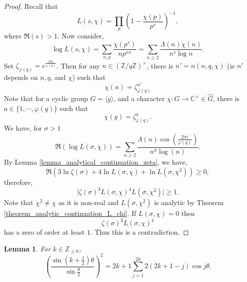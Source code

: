 \documentclass{article}
\newtheorem{lemma}{Lemma}[section]
\newcommand{\Z}[0]{\mathbb{Z}}
\newcommand{\C}[0]{\mathbb{C}}
\begin{document}
\begin{proof}
Recall that 
\begin{equation*}
  L(s,\chi) = \prod_{p}\left(1-{\frac {\chi(p)}{p^s}}\right)^{-1},
\end{equation*}
where $\Re(s)>1$. Now consider,
\begin{equation*}
  \log L(s,\chi) = \sum_{n,p}{\frac {\chi(p^s)} {np^{ns}}} = \sum_{n\geq 2}{\frac {\Lambda(n)\chi(n)} {n^s\log n}}.
\end{equation*}
Set $\zeta_{\varphi(q)} = e^{{\frac {2\pi i} {\varphi(q)}}}$. Then for any $n\in(\Z/q\Z)^\times$, there is $n'=n(n,q,\chi)$ (ie $n'$ depends on $n,q$, and $\chi$) such that 
\begin{equation*}
  \chi(n) = \zeta_{\varphi(q)}^{n'}
\end{equation*}
Note that for a cyclic group $G = \langle g\rangle$, and a character $\chi:G\to\C^\times\in\hat{G}$, there is $a\in\{1,\cdots,\varphi(q)\}$ such that 
\begin{equation*}
  \chi(g) = \zeta_{\varphi(q)}^a.
\end{equation*}
We have, for $\sigma>1$
\begin{equation*}
  \Re(\log L(\sigma,\chi)) = \sum_{n\geq2}{\frac {\Lambda(n)\cos\left({\frac {2\pi i} {\varphi(q)}}\right)} {n^\sigma\log(n)}}.
\end{equation*}
By Lemma \ref{lemma_analytical_continuation_zeta}, we have,
\begin{equation*}
  \Re(3\ln\zeta(\sigma)+4\ln L(\sigma,\chi)+\ln L(\sigma,\chi^2))\geq 0,
\end{equation*}
therefore,
\begin{equation*}
  \vert \zeta(\sigma)^3L(\sigma,\chi)^4L(\sigma,\chi^2)\vert\geq1.
\end{equation*}
Note that $\chi^2\not=\chi$ as it is non-real and $L(\sigma,\chi^2)$ is analytic by Theorem \ref{theorem_analytic_continuation_L_chi}. If $L(\sigma,\chi)=0$ then 
\begin{equation*}
  \zeta(\sigma)^3L(\sigma,\chi)^4
\end{equation*}
has a zero of order at least $1$. Thus this is a contradiction.
\end{proof}

\begin{lemma}For $k\in\Z_{\geq0}$, 
  \begin{equation*}
    \left({\frac {\sin\left(k+{\frac 1 2}\right)\theta} {\sin{\frac \theta 2}}}\right)^2 = 2k+1\sum_{j=1}^{2k}2(2k+1-j)\cos j\theta.
  \end{equation*}
  \label{lemma_trig_sum_cos}
\end{lemma}
\end{document}
